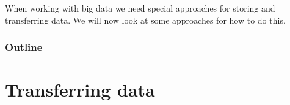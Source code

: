 \documentclass[aspectratio=169,usenames,dvipsnames]{beamer}
\begin{document}
{

    \begin{frame}[plain]
        \begin{center}
        \vfill\vfill
        \large When working with big data we need special approaches for storing and
        transferring data. \pause
        \vfill
        We will now look at some approaches for how to do this.
        \vfill
        \end{center}
    \end{frame}
}
    \begin{frame}
    \frametitle{Outline}
    \begin{minipage}{0.25\textwidth}
    \mbox{}
    \end{minipage}
    \begin{minipage}{0.6\textwidth}
    \tableofcontents[hideallsubsections]
    \end{minipage}
    \end{frame}

\section{Transferring data}
\end{document}
